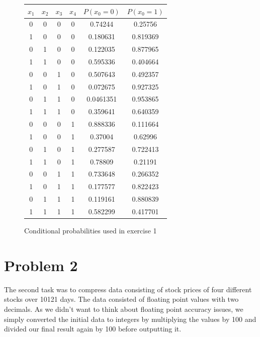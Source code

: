 \documentclass{article}
\begin{document}
\begin{figure}

\begin{center}
\begin{tabular}{|c|c|c|c|c|c|}
\hline
$x_1$ & $x_2$ & $x_3$ & $x_4$ & $P(x_0 = 0)$ & $P(x_0 = 1) $ \\ \hline
   0 & 0 & 0 & 0 & 0.74244 & 0.25756 \\ \hline
   1 & 0 & 0 & 0 & 0.180631 & 0.819369 \\ \hline
   0 & 1 & 0 & 0 & 0.122035 & 0.877965 \\ \hline
   1 & 1 & 0 & 0 & 0.595336 & 0.404664 \\ \hline
   0 & 0 & 1 & 0 & 0.507643 & 0.492357 \\ \hline
   1 & 0 & 1 & 0 & 0.072675 & 0.927325 \\ \hline
   0 & 1 & 1 & 0 & 0.0461351 & 0.953865 \\ \hline
   1 & 1 & 1 & 0 & 0.359641 & 0.640359 \\ \hline
   0 & 0 & 0 & 1 & 0.888336 & 0.111664 \\ \hline
   1 & 0 & 0 & 1 & 0.37004 & 0.62996 \\ \hline
   0 & 1 & 0 & 1 & 0.277587 & 0.722413 \\ \hline
   1 & 1 & 0 & 1 & 0.78809 & 0.21191 \\ \hline
   0 & 0 & 1 & 1 & 0.733648 & 0.266352 \\ \hline
   1 & 0 & 1 & 1 & 0.177577 & 0.822423 \\ \hline
   0 & 1 & 1 & 1 & 0.119161 & 0.880839 \\ \hline
   1 & 1 & 1 & 1 & 0.582299 & 0.417701 \\ \hline
\end{tabular}
\end{center}
\caption{Conditional probabilities used in exercise 1}
\label{ex1_probs}
\end{figure}

\section{Problem 2}

The second task was to compress data consisting of stock prices of four different stocks over 10121 days.
The data consisted of floating point values with two decimals.
As we didn't want to think about floating point accuracy issues, we simply converted the initial data to integers by multiplying the values by 100 and divided our final result again by 100 before outputting it.
\end{document}

